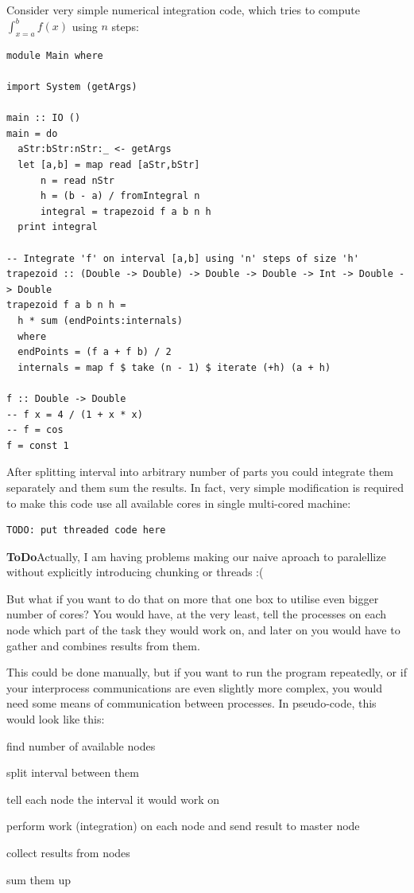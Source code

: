 \documentclass{tmr}
\newcommand{\ToDo}[1]{\textbf{ToDo}{#1}}
\begin{document}
Consider very simple numerical integration code, which tries to
compute $\int_{x=a}^{b} f(x)$ using $n$ steps:
\begin{listing}
\begin{Verbatim}
module Main where

import System (getArgs)

main :: IO ()
main = do
  aStr:bStr:nStr:_ <- getArgs
  let [a,b] = map read [aStr,bStr]
      n = read nStr
      h = (b - a) / fromIntegral n
      integral = trapezoid f a b n h
  print integral 

-- Integrate 'f' on interval [a,b] using 'n' steps of size 'h'
trapezoid :: (Double -> Double) -> Double -> Double -> Int -> Double -> Double
trapezoid f a b n h =
  h * sum (endPoints:internals)
  where
  endPoints = (f a + f b) / 2
  internals = map f $ take (n - 1) $ iterate (+h) (a + h)

f :: Double -> Double
-- f x = 4 / (1 + x * x)
-- f = cos
f = const 1
\end{Verbatim}
\end{listing}

After splitting interval into arbitrary number of parts you could
integrate them separately and them sum the results. In fact, very
simple modification is required to make this code use all available
cores in single multi-cored machine:
\begin{Verbatim}
TODO: put threaded code here
\end{Verbatim}

\ToDo Actually, I am having problems making our naive aproach to
paralellize without explicitly introducing chunking or threads :(

But what if you want to do that on more that one box to utilise even
bigger number of cores? You would have, at the very least, tell the
processes on each node which part of the task they would work on, and
later on you would have to gather and combines results from them.

This could be done manually, but if you want to run the program
repeatedly, or if your interprocess communications are even slightly
more complex, you would need some means of communication between
processes. In pseudo-code, this would look like this:

\begin{compactitem}
\item find number of available nodes
\item split interval between them
\item tell each node the interval it would work on
\item perform work (integration) on each node and send result to master node
\item collect results from nodes
\item sum them up
\end{compactitem}
\end{document}
